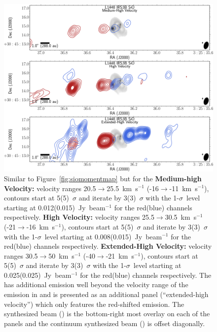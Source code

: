 \begin{figure}[H]
   \begin{center}
   \includegraphics[width=\textwidth]{img/L1448IRS3B_SiO_image_taper1500k__panel2.pdf} %
   \end{center} 
   \caption{Similar to Figure~\ref{fig:siomomentmap} but for the \textbf{Medium-high Velocity:} velocity ranges 20.5$\rightarrow$25.5~km~s$^{-1}$ (-16$\rightarrow$-11~km~s$^{-1}$), contours start at 5(5)~$\sigma$ and iterate by 3(3)~$\sigma$ with the 1-$\sigma$~level starting at 0.012(0.015)~Jy~beam$^{-1}$ for the red(blue) channels respectively. \textbf{High Velocity:} velocity ranges 25.5$\rightarrow$30.5~km~s$^{-1}$ (-21$\rightarrow$-16~km~s$^{-1}$), contours start at 5(5)~$\sigma$ and iterate by 3(3)~$\sigma$ with the 1-$\sigma$~level starting at 0.008(0.015)~Jy~beam$^{-1}$ for the red(blue) channels respectively. \textbf{Extended-High Velocity:} velocity ranges 30.5$\rightarrow$50~km~s$^{-1}$ (-40$\rightarrow$-21~km~s$^{-1}$), contours start at 5(5)~$\sigma$ and iterate by 3(3)~$\sigma$ with the 1-$\sigma$~level starting at 0.025(0.025)~Jy~beam$^{-1}$ for the red(blue) channels respectively. The \sio\space has additional emission well beyond the velocity range of the emission in \co\space and is presented as an additional panel (``extended-high velocity'') which only features the red-shifted emission. The \sio\space synthesized beam (\siobeam) is the bottom-right most overlay on each of the panels and the continuum synthesized beam (\contbeam) is offset diagonally. }\label{fig:siomomentmap2}
\end{figure}
